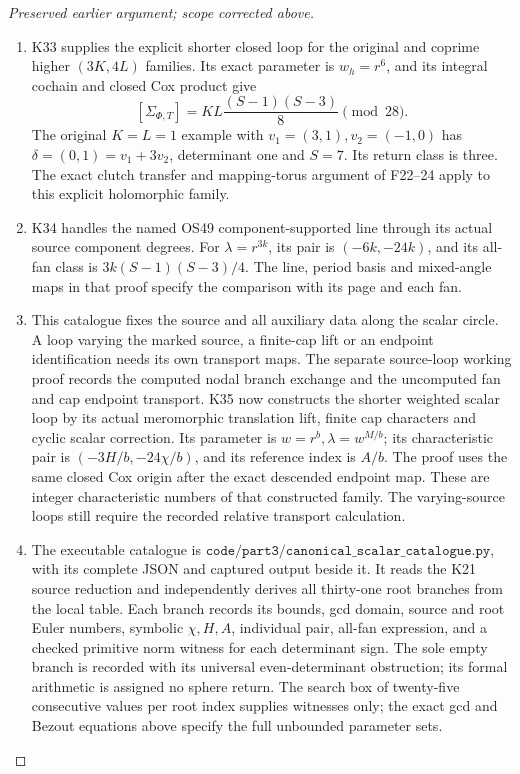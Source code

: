 \begin{proof}[Preserved earlier argument; scope corrected above]
\begin{enumerate}[label=\arabic*.]
\medskip\noindent\textbf{C4. Other specified loops and scope}

\par\nobreak

\item K33 supplies the explicit shorter closed
loop for the original and coprime higher
\((3K,4L)\) families. Its exact parameter
is \(w_h=r^6\), and its integral cochain
and closed Cox product give
\[
 [\Sigma_{\Phi,T}]
       =KL\frac{(S-1)(S-3)}8 \pmod {28}.
\]
The original \(K=L=1\) example with
\(v_1=(3,1),v_2=(-1,0)\) has
\(\delta=(0,1)=v_1+3v_2\), determinant
one and \(S=7\). Its return class is
three. The exact clutch transfer and
mapping-torus argument of F22--24 apply
to this explicit holomorphic family.

\item K34 handles the named OS49
component-supported line through its
actual source component degrees. For
\(\lambda=r^{3k}\), its pair is
\((-6k,-24k)\), and its all-fan class
is \(3k(S-1)(S-3)/4\). The line,
period basis and mixed-angle maps
in that proof specify the comparison
with its page and each fan.

\item This catalogue fixes the source and
all auxiliary data along the scalar
circle. A loop varying the marked
source, a finite-cap lift or an
endpoint identification needs its
own transport maps. The separate
source-loop working proof records
the computed nodal branch exchange
and the uncomputed fan and cap
endpoint transport. K35 now constructs the shorter
weighted scalar loop by its actual
meromorphic translation lift, finite
cap characters and cyclic scalar
correction. Its parameter is
\(w=r^b,\lambda=w^{M/b}\); its
characteristic pair is
\((-3H/b,-24\chi/b)\), and its
reference index is \(A/b\).
The proof uses the same closed Cox
origin after the exact descended
endpoint map. These are integer
characteristic numbers of that
constructed family. The varying-source
loops still require the recorded
relative transport calculation.

\item The executable catalogue is
\(\texttt{code/part3/canonical\_scalar\_catalogue.py}\),
with its complete JSON and captured output beside it.
It reads the K21 source reduction and independently
derives all thirty-one root branches from the local
table. Each branch records its bounds, gcd domain,
source and root Euler numbers, symbolic
\(\chi,H,A\), individual pair, all-fan expression,
and a checked primitive norm witness for each
determinant sign. The sole empty branch is recorded
with its universal even-determinant obstruction;
its formal arithmetic is assigned no sphere return.
The search box of twenty-five consecutive values
per root index supplies witnesses only; the exact
gcd and Bezout equations above specify the full
unbounded parameter sets.


\end{enumerate}
\end{proof}
